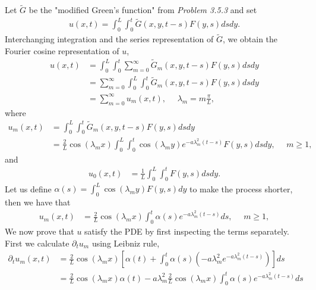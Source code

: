 \begin{questions}
\begin{solution}
Let $\tilde{G}$ be the "modified Green's function" from \textsl{Problem 3.5.3} and set
\begin{align*}
u(x,t)=\int_0^L\int_0^t\tilde{G}(x,y,t-s)F(y,s)dsdy.
\end{align*}
Interchanging integration and the series representation of $\tilde{G}$, we obtain the Fourier cosine representation of $u$,
\begin{align*}
u(x,t)&=\int_0^L\int_0^t\sum_{m=0}^{\infty}\tilde{G}_m(x,y,t-s)F(y,s)dsdy\\
&=\sum_{m=0}^{\infty}\int_0^L\int_0^t\tilde{G}_m(x,y,t-s)F(y,s)dsdy\\
&=\sum_{m=0}^{\infty}u_m(x,t),~~~~~~\lambda_m=m\frac{\pi}{L},
\end{align*}
where 
\begin{align*}
u_m(x,t)&=\int_0^L\int_0^t\tilde{G}_m(x,y,t-s)F(y,s)dsdy\\
&=\frac{2}{L}\cos(\lambda_mx)\int_0^L\int_0^t\cos(\lambda_my)e^{-a\lambda_m^2(t-s)}F(y,s)dsdy,~~~~~~m\geq 1,
\end{align*}
and
\begin{align*}
u_0(x,t)&=\frac{1}{L}\int_0^L\int_0^tF(y,s)dsdy.
\end{align*}
Let us define $\alpha(s)=\int_0^L\cos(\lambda_my)F(y,s)dy$ to make the process shorter, then we have that 
\begin{align*}
u_m(x,t)&=\frac{2}{L}\cos(\lambda_mx)\int_0^t\alpha(s)e^{-a\lambda_m^2(t-s)}ds,~~~~~~m\geq 1,
\end{align*} 
We now prove that $u$ satisfy the PDE by first inspecting the terms separately. First we calculate $\partial_tu_m$ using Leibniz rule,
\begin{align*}
\partial_tu_m(x,t)&=\frac{2}{L}\cos(\lambda_mx)\left[\alpha(t)+\int_0^t\alpha(s)\left(-a\lambda_m^2e^{-a\lambda_m^2(t-s)}\right)\right]ds\\
&=\frac{2}{L}\cos(\lambda_mx)\alpha(t)-a\lambda_m^2\frac{2}{L}\cos(\lambda_mx)\int_0^t\alpha(s)e^{-a\lambda_m^2(t-s)}ds\\

\end{align*}
\end{solution}
\end{questions}

